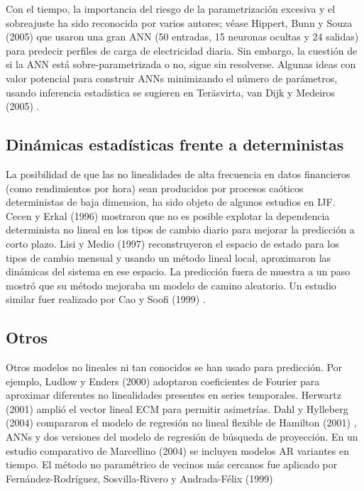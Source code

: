 \documentclass{llncs}
\begin{document}
Con el tiempo, la importancia del riesgo de la parametrización excesiva y el sobreajuste ha sido reconocida por varios autores; véase Hippert, Bunn y Souza (2005) \cite{Hippert2005425} que usaron una gran ANN (50 entradas, 15 neuronas ocultas y 24 salidas) para predecir perfiles de carga de electricidad diaria. Sin embargo, la cuestión de si la ANN está sobre-parametrizada o no, sigue sin resolverse. Algunas ideas con valor potencial para construir ANNs minimizando el número de parámetros, usando inferencia estadística se sugieren en Teräsvirta, van Dijk y Medeiros (2005) \cite{Teräsvirta2005755}.

\subsection{Dinámicas estadísticas frente a deterministas}
La posibilidad de que las no linealidades de alta frecuencia en datos financieros (como rendimientos por hora) sean producidos por procesos caóticos deterministas de baja dimension, ha sido objeto de algunos estudios en IJF. Cecen y Erkal (1996) \cite{Cecen1996465} mostraron que no es posible explotar la dependencia determinista no lineal en los tipos de cambio diario para mejorar la predicción a corto plazo. Lisi y Medio (1997) \cite{Lisi1997255} reconstruyeron el espacio de estado para los tipos de cambio mensual y usando un método lineal local, aproximaron las dinámicas del sistema en ese espacio. La predicción fuera de muestra a un paso mostró que su método mejoraba un modelo de camino aleatorio. Un estudio similar fuer realizado por Cao y Soofi (1999) \cite{Cao1999421}.

\subsection{Otros}
Otros modelos no lineales ni tan conocidos se han usado para predicción. Por ejemplo, Ludlow y Enders (2000) \cite{Ludlow2000333} adoptaron coeficientes de Fourier para aproximar diferentes no linealidades presentes en series temporales. Herwartz (2001) \cite{Herwartz2001231} amplió el vector lineal ECM para permitir asimetrías. Dahl y Hylleberg (2004) \cite{Dahl2004201} compararon el modelo de regresión no lineal flexible de Hamilton (2001) \cite{Hamilton2001537}, ANNs y dos versiones del modelo de regresión de búsqueda de proyección. En un estudio comparativo de Marcellino (2004) \cite{Marcellino2004359} se incluyen modelos AR variantes en tiempo. El método no paramétrico de vecinos más cercanos fue aplicado por  Fernández-Rodríguez, Sosvilla-Rivero y Andrada-Félix (1999) \cite{Fernández-Rodríguez1999383}
\end{document}
